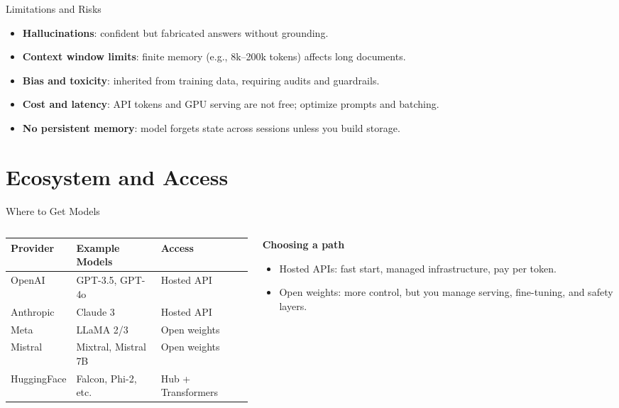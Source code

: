 \documentclass[aspectratio=169]{beamer}
\begin{document}
\begin{frame}{Limitations and Risks}
  \begin{itemize}
    \item \textbf{Hallucinations}: confident but fabricated answers without grounding.
    \item \textbf{Context window limits}: finite memory (e.g., 8k--200k tokens) affects long documents.
    \item \textbf{Bias and toxicity}: inherited from training data, requiring audits and guardrails.
    \item \textbf{Cost and latency}: API tokens and GPU serving are not free; optimize prompts and batching.
    \item \textbf{No persistent memory}: model forgets state across sessions unless you build storage.
  \end{itemize}
\end{frame}

\section{Ecosystem and Access}

\begin{frame}{Where to Get Models}
  \begin{columns}[T,onlytextwidth]
    \begin{column}{0.48\linewidth}
      \begin{tabular}{@{}lll@{}}
        \toprule
        Provider & Example Models & Access \\
        \midrule
        OpenAI & GPT-3.5, GPT-4o & Hosted API \\
        Anthropic & Claude 3 & Hosted API \\
        Meta & LLaMA 2/3 & Open weights \\
        Mistral & Mixtral, Mistral 7B & Open weights \\
        HuggingFace & Falcon, Phi-2, etc. & Hub + Transformers \\
        \bottomrule
      \end{tabular}
    \end{column}
    \begin{column}{0.45\linewidth}
      \textbf{Choosing a path}
      \begin{itemize}
        \item Hosted APIs: fast start, managed infrastructure, pay per token.
        \item Open weights: more control, but you manage serving, fine-tuning, and safety layers.
      \end{itemize}
    \end{column}
  \end{columns}
\end{frame}
\end{document}
